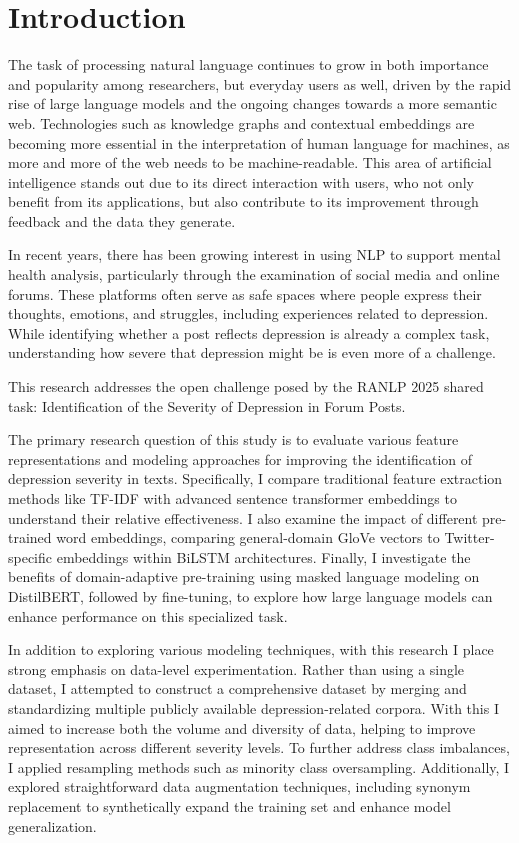 \section{Introduction}

The task of processing natural language continues to grow in both importance and popularity among researchers, but everyday users as well, driven by the rapid rise of large language models and the ongoing changes towards a more semantic web. Technologies such as knowledge graphs and contextual embeddings are becoming more essential in the interpretation of human language for machines, as more and more of the web needs to be machine-readable. This area of artificial intelligence stands out due to its direct interaction with users, who not only benefit from its applications, but also contribute to its improvement through feedback and the data they generate.

In recent years, there has been growing interest in using NLP to support mental health analysis, particularly through the examination of social media and online forums. These platforms often serve as safe spaces where people express their thoughts, emotions, and struggles, including experiences related to depression. While identifying whether a post reflects depression is already a complex task, understanding how severe that depression might be is even more of a challenge.

This research addresses the open challenge posed by the RANLP 2025 shared task: Identification of the Severity of Depression in Forum Posts.

The primary research question of this study is to evaluate various feature representations and modeling approaches for improving the identification of depression severity in texts. Specifically, I compare traditional feature extraction methods like TF-IDF with advanced sentence transformer embeddings to understand their relative effectiveness. I also examine the impact of different pre-trained word embeddings, comparing general-domain GloVe vectors to Twitter-specific embeddings within BiLSTM architectures. Finally, I investigate the benefits of domain-adaptive pre-training using masked language modeling on DistilBERT, followed by fine-tuning, to explore how large language models can enhance performance on this specialized task.

In addition to exploring various modeling techniques, with this research I place strong emphasis on data-level experimentation. Rather than using a single dataset, I attempted to construct a comprehensive dataset by merging and standardizing multiple publicly available depression-related corpora. With this I aimed to increase both the volume and diversity of data, helping to improve representation across different severity levels. To further address class imbalances, I applied resampling methods such as minority class oversampling. Additionally, I explored straightforward data augmentation techniques, including synonym replacement to synthetically expand the training set and enhance model generalization.

